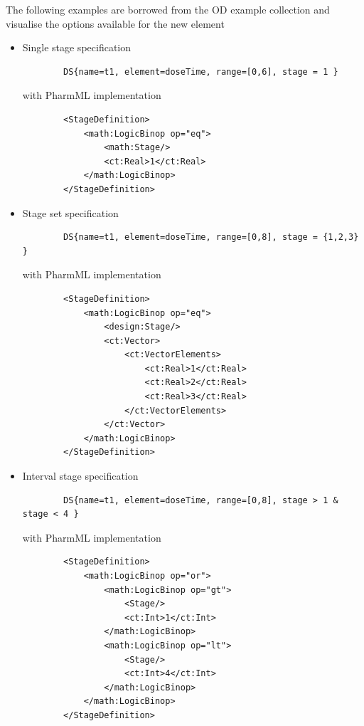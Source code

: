 The following examples are borrowed from the OD example collection 
\cite{CommetsExamples2015} and visualise the options available for the new 
 element
\begin{itemize}
\item 
Single stage specification
\lstset{language=MLX}
\begin{lstlisting}
        DS{name=t1, element=doseTime, range=[0,6], stage = 1 }
\end{lstlisting}
with PharmML implementation
\lstset{language=XML}
\begin{lstlisting}
        <StageDefinition>
            <math:LogicBinop op="eq">
                <math:Stage/>
                <ct:Real>1</ct:Real>
            </math:LogicBinop>
        </StageDefinition>
\end{lstlisting}
\item 
Stage set specification
\lstset{language=MLX}
\begin{lstlisting}
        DS{name=t1, element=doseTime, range=[0,8], stage = {1,2,3} }
\end{lstlisting}
\lstset{language=XML}
with PharmML implementation
\begin{lstlisting}
        <StageDefinition>
            <math:LogicBinop op="eq">
                <design:Stage/>
                <ct:Vector>
                    <ct:VectorElements>
                        <ct:Real>1</ct:Real>
                        <ct:Real>2</ct:Real>
                        <ct:Real>3</ct:Real>
                    </ct:VectorElements>
                </ct:Vector>
            </math:LogicBinop>
        </StageDefinition>
\end{lstlisting}
\item 
Interval stage specification
\lstset{language=MLX}
\begin{lstlisting}
        DS{name=t1, element=doseTime, range=[0,8], stage > 1 & stage < 4 }
\end{lstlisting}
\lstset{language=XML}
with PharmML implementation
\begin{lstlisting}
        <StageDefinition>
            <math:LogicBinop op="or">
                <math:LogicBinop op="gt">
                    <Stage/>
                    <ct:Int>1</ct:Int>
                </math:LogicBinop>
                <math:LogicBinop op="lt">
                    <Stage/>
                    <ct:Int>4</ct:Int>
                </math:LogicBinop>
            </math:LogicBinop>
        </StageDefinition>
\end{lstlisting}
\end{itemize}

